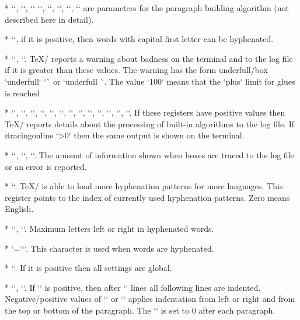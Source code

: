 {* \y``,
  \y``, \y`\emergencystretch=0pt`
  \y``,
  \y``,
  \y``,
  \y`\hfuzz=0.1pt`,
  \y`\vfuzz=0.1pt`
are parameters for the paragraph building algorithm (not described here in
detail).

* \y``, if it is positive, then words with capital first letter can
  be hyphenated. 

* \y``,
  \y``. \TeX/ reports a warning about \iid badness on the terminal
  and to the log file if it is greater than these values. The warning has the form
  \ii underfull/box `underfull` `\hbox` or `underfull \vbox`. The value `100`
  means that the `plus` limit for glues is reached.

* \y``,
  \y``,
  \y``,
  \y``,
  \y``,
  \y``,
  \y``,
  \y``,
  \y``,
  \y``, 
  \y``,
  \y``, 
  \y``. 
  If these registers have positive values then \TeX/ reports details about
  the processing of built-in
  algorithms to the log file. If \i tracingonline `\tracingonline>0` then the same
  output is shown on the terminal.

* \y``,
  \y``,
  \y``.
  The amount of information shown when boxes are traced to the log file or an error is
  reported.

* \y``. 
  \TeX/ is able to load more hyphenation patterns for more
  languages. This register points to the index of currently used
  hyphenation patterns. Zero means English.

* \y``, \y``. Maximum letters left or right in
  hyphenated words.

* \y`=``\-`. This character is used when words are
  hyphenated.

* \y``. If it is positive then all settings are global.

* \y``,
  \y`\hangindent=0pt`.
  If \x`\hangindent` is positive, then after \x`\hangafter` lines all following
  lines are indented. Negative/positive values of \x`\hangindent` or \x`\hangafter` applies
  indentation from left or right and from the top or bottom of the paragraph.
  The \x`\hangindent` is set to 0 after each paragraph.

}

